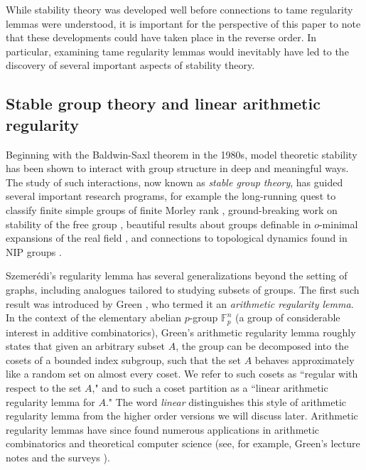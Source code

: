 \documentclass[12pt,oneside,british,a4wide]{amsart}
\numberwithin{equation}{section}
\theoremstyle{definition}
\def\F{\mathbb{F}}
\begin{document}
While stability theory was developed well before connections to tame regularity lemmas were understood, it is important for the perspective of this paper to note that these developments could have taken place in the reverse order. In particular, examining tame regularity lemmas would inevitably have led to the discovery of several important aspects of stability theory.

\subsection{Stable group theory and linear arithmetic regularity}\label{subsec:linearinformal}

Beginning with the Baldwin-Saxl theorem \cite{Baldwin.1976} in the 1980s, model theoretic stability has  been shown to interact with group structure in deep and meaningful ways.  The study of such interactions, now known as \emph{stable group theory}, has guided several important research programs, for example the long-running quest to classify finite simple groups of finite Morley rank \cite{Cherlin.1979}, ground-breaking work on stability of the free group \cite{Sela.2013}, beautiful results about groups definable in $o$-minimal expansions of the real field \cite{Peterzil.2007}, and connections to topological dynamics found in NIP groups \cite{Pillay.2013}.  


Szemer\'{e}di's regularity lemma has several generalizations beyond the setting of graphs, including analogues tailored to studying subsets of groups. The first such result was introduced by Green \cite{Green.2005}, who termed it an \emph{arithmetic regularity lemma}. In the context of the elementary abelian $p$-group $\F_p^n$ (a group of considerable interest in additive combinatorics), Green's arithmetic regularity lemma roughly states that given an arbitrary subset $A$, the group can be decomposed into the cosets of a bounded index subgroup, such that the set $A$ behaves approximately like a random set on almost every coset. We refer to such cosets as  ``regular with respect to the set $A$," and to such a coset partition as  a ``linear arithmetic regularity lemma for $A$." The word \emph{linear} distinguishes this style of arithmetic regularity lemma from the higher order versions we will discuss later.  Arithmetic regularity lemmas have since found numerous applications in arithmetic combinatorics and theoretical computer science (see, for example, Green's lecture notes \cite{Green.2007} and the surveys \cite{Gowers.2010,Hatami.2019}). 
\end{document}
